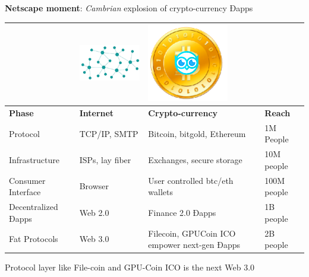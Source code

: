 \textbf{Netscape moment}: \emph{Cambrian} explosion of crypto-currency Ðapps
 

 \begin{adjustbox}{width=.8\textwidth}
\begin{tabularx} {\textwidth}{|X|X|X|X|}
 \hline
& \includegraphics[scale=0.2]{static/decentnew} &  \includegraphics[scale=0.2]{static/hootcoin} & \\
 \hline
\textbf{Phase} & \textbf{Internet} & \textbf{Crypto-currency} & \textbf{Reach}\\
\hline
Protocol & TCP/IP, SMTP & Bitcoin, bitgold, Ethereum & 1M People \\
\hline
Infrastructure & ISPs, lay fiber & Exchanges, secure storage & 10M people \\
\hline
Consumer Interface & Browser & User controlled btc/eth wallets & 100M people \\
\hline
Decentralized Ðapps & Web 2.0 & Finance 2.0 Ðapps & 1B people\\
\hline
Fat Protocols & Web 3.0 & Filecoin, GPUCoin ICO empower next-gen Ðapps & 2B people\\

\hline
\end{tabularx}
\end{adjustbox}

Protocol layer like File-coin and GPU-Coin ICO is the next Web 3.0
